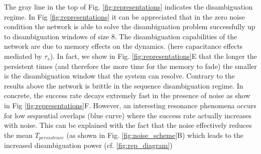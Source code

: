 \documentclass[10pt,a4paper]{article}
\begin{document}
The gray line in the top of Fig. \ref{fig:representations} indicates the disambiguation regime. In Fig \ref{fig:representations} it can be appreciated that in the zero noise condition the network is able to solve the disambiguation problem successfully up to disambiguation windows of size 8. The disambiguation capabilities of the network are due to memory effects on the dynamics. (here capacitance effects mediated by $\tau_s$). In fact, we show in Fig. \ref{fig:representations}E that the longer the persistent times (and therefore the more time for the memory to fade) the smaller is the disambiguation window  that the system can resolve. Contrary to the results above the network is brittle in the sequence disambiguation regime. In concrete, the success rate decays extremely fast in the presence of noise as show in Fig \ref{fig:representations}F. However, an interesting resonance phenomena occurs for low sequential overlaps (blue curve) where the success rate actually increases with noise. This can be explained with the fact that the noise effectively reduces the mean $T_{persistence}$ (as shown in Fig. \ref{fig:noise_scheme}B) which leads to the increased disambiguation power (cf. \ref{fig:rep_diagram})
\end{document}
